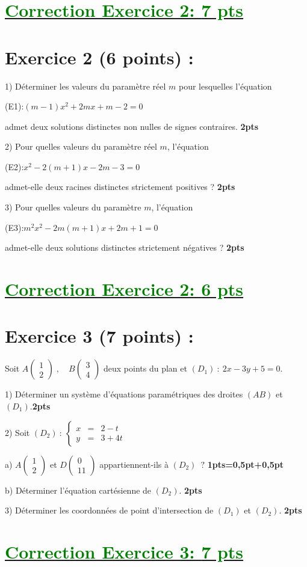 \documentclass[12pt]{article}
\begin{document}
\section*{\underline{\textcolor{green}{Correction Exercice 2: \textbf{7 pts}}}}
\section*{Exercice 2 (6 points) :}
1) Déterminer les valeurs du paramètre réel \( m \) pour lesquelles l'équation 

(E1):\( (m - 1)x^2 + 2mx + m - 2 = 0 \) 

admet deux solutions distinctes non nulles de signes contraires. \textbf{2pts}

2) Pour quelles valeurs du paramètre réel \( m \), l'équation

(E2):\( x^2 - 2(m + 1)x - 2m - 3 = 0 \) 
 
admet-elle deux racines distinctes strictement positives ? \textbf{2pts}

3) Pour quelles valeurs du paramètre \( m \), l'équation
 
(E3):\( m^{2}x^2 - 2m(m + 1)x + 2m + 1 = 0 \) 

admet-elle deux solutions distinctes strictement négatives ? \textbf{2pts}
\section*{\underline{\textcolor{green}{Correction Exercice 2: \textbf{6 pts}}}}
\section*{Exercice 3 (7 points) :}
Soit $A\begin{pmatrix} 1 \\ 2\end{pmatrix}\;,\quad B\begin{pmatrix} 3 \\ 4\end{pmatrix}$ deux points du plan et $(D_{1})\ :\ 2x-3y+5=0.$

1) Déterminer un système d'équations paramétriques des droites $(AB)$ et $(D_{1}).$\textbf{2pts}

2) Soit $(D_{2})\ :\ \left\lbrace\begin{array}{rcl} x&=&2-t \\ y&=&3+4t\end{array}\right.$

a) $A\begin{pmatrix} 1 \\ 2\end{pmatrix}$ et $D\begin{pmatrix} 0 \\ 11\end{pmatrix}$ appartiennent-ils à $(D_{2})\;\ ?$ \textbf{1pts=0,5pt+0,5pt}

b) Déterminer l'équation cartésienne de $(D_{2})$. \textbf{2pts}

3) Déterminer les coordonnées de point d'intersection de $(D_{1})$ et $(D_{2})$. \textbf{2pts}
\section*{\underline{\textcolor{green}{Correction Exercice 3: \textbf{7 pts}}}}
\end{document}
